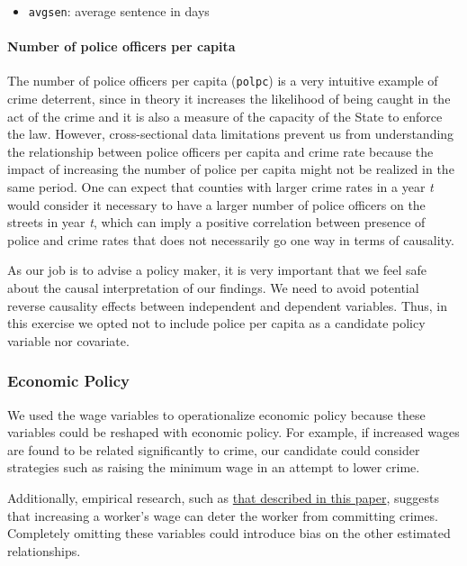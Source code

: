 \documentclass[]{article}
\providecommand{\tightlist}{%
  \setlength{\itemsep}{0pt}\setlength{\parskip}{0pt}}
\let\oldparagraph\paragraph
\renewcommand{\paragraph}[1]{\oldparagraph{#1}\mbox{}}
\begin{document}
\begin{itemize}
\tightlist
\item
  \texttt{avgsen}: average sentence in days
\end{itemize}

\hypertarget{number-of-police-officers-per-capita}{%
\paragraph{Number of police officers per
capita}\label{number-of-police-officers-per-capita}}

The number of police officers per capita (\texttt{polpc}) is a very
intuitive example of crime deterrent, since in theory it increases the
likelihood of being caught in the act of the crime and it is also a
measure of the capacity of the State to enforce the law. However,
cross-sectional data limitations prevent us from understanding the
relationship between police officers per capita and crime rate because
the impact of increasing the number of police per capita might not be
realized in the same period. One can expect that counties with larger
crime rates in a year \emph{t} would consider it necessary to have a
larger number of police officers on the streets in year \emph{t}, which
can imply a positive correlation between presence of police and crime
rates that does not necessarily go one way in terms of causality.

As our job is to advise a policy maker, it is very important that we
feel safe about the causal interpretation of our findings. We need to
avoid potential reverse causality effects between independent and
dependent variables. Thus, in this exercise we opted not to include
police per capita as a candidate policy variable nor covariate.

\hypertarget{economic-policy}{%
\subsubsection{Economic Policy}\label{economic-policy}}

We used the wage variables to operationalize economic policy because
these variables could be reshaped with economic policy. For example, if
increased wages are found to be related significantly to crime, our
candidate could consider strategies such as raising the minimum wage in
an attempt to lower crime.

Additionally, empirical research, such as
\href{https://www.journals.uchicago.edu/doi/abs/10.1086/449290}{that
described in this paper}, suggests that increasing a worker's wage can
deter the worker from committing crimes. Completely omitting these
variables could introduce bias on the other estimated relationships.
\end{document}
